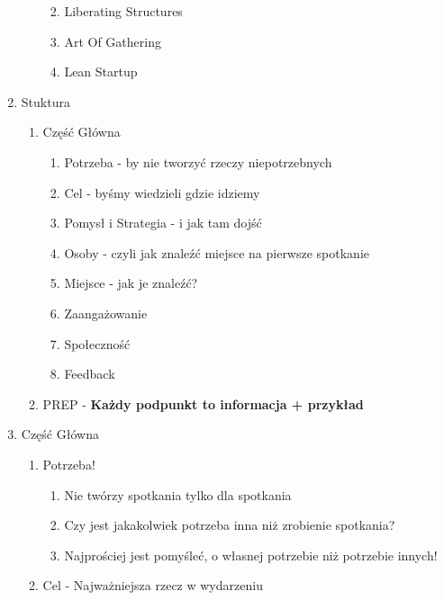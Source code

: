 \begin{enumerate}
\begin{enumerate}
    \begin{enumerate}
    \def\labelenumiii{\arabic{enumiii}.}
    \tightlist
    \item
      Liberating Structures
    \item
      Art Of Gathering
    \item
      Lean Startup
    \end{enumerate}
  \end{enumerate}
\item
  Stuktura

  \begin{enumerate}
  \def\labelenumii{\arabic{enumii}.}
  \tightlist
  \item
    Część Główna

    \begin{enumerate}
    \def\labelenumiii{\arabic{enumiii}.}
    \tightlist
    \item
      Potrzeba - by nie tworzyć rzeczy niepotrzebnych
    \item
      Cel - byśmy wiedzieli gdzie idziemy
    \item
      Pomysł i Strategia - i jak tam dojść
    \item
      Osoby - czyli jak znaleźć miejsce na pierwsze spotkanie
    \item
      Miejsce - jak je znaleźć?
    \item
      Zaangażowanie
    \item
      Społeczność
    \item
      Feedback
    \end{enumerate}
  \item
    PREP - \textbf{Każdy podpunkt to informacja + przykład}
  \end{enumerate}
\item
  Część Główna

  \begin{enumerate}
  \def\labelenumii{\arabic{enumii}.}
  \tightlist
  \item
    Potrzeba!

    \begin{enumerate}
    \def\labelenumiii{\arabic{enumiii}.}
    \tightlist
    \item
      Nie twórzy spotkania tylko dla spotkania
    \item
      Czy jest jakakolwiek potrzeba inna niż zrobienie spotkania?
    \item
      Najprościej jest pomyśleć, o własnej potrzebie niż potrzebie
      innych!
    \end{enumerate}
  \item
    Cel - Najważniejsza rzecz w wydarzeniu


\end{enumerate}
\end{enumerate}
